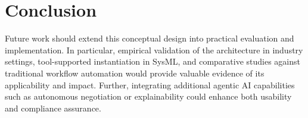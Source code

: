 \section{Conclusion}
Future work should extend this conceptual design into practical evaluation and implementation. In particular, empirical validation of the architecture in industry settings, tool-supported instantiation in SysML, and comparative studies against traditional workflow automation would provide valuable evidence of its applicability and impact. Further, integrating additional agentic AI capabilities such as autonomous negotiation or explainability could enhance both usability and compliance assurance.  

